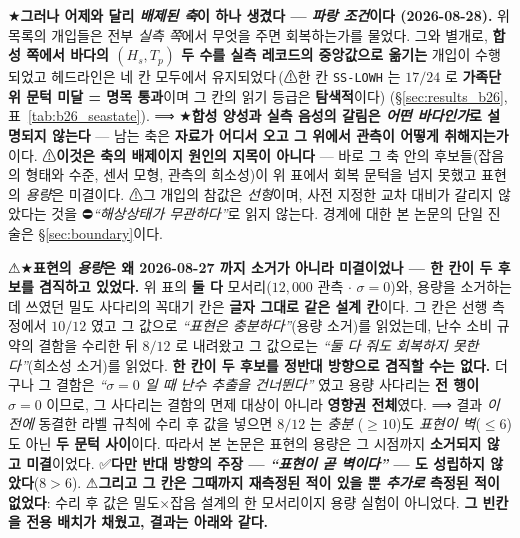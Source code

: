 \documentclass[11pt]{report}
\numberwithin{equation}{chapter}
\numberwithin{figure}{chapter}
\numberwithin{table}{chapter}
\newcommand{\SSLowhNominal}{\,(⚠한 칸 \texttt{SS-LOWH} 는 $17/24$ 로
  \textbf{가족단위 문턱 미달 = 명목 통과}이며 그 칸의 읽기 등급은 \textbf{탐색적}이다)}
\begin{document}
★\textbf{그러나 어제와 달리 \emph{배제된 축}이 하나 생겼다 --- \emph{파랑 조건}이다
(2026-08-28).} 위 목록의 개입들은 전부 \emph{실측 쪽}에서 무엇을 주면 회복하는가를
물었다. 그와 별개로, \textbf{합성 쪽에서 바다의 $(H_s, T_p)$ 두 수를 실측 레코드의
중앙값으로 옮기는} 개입이 수행되었고 헤드라인은 네 칸 모두에서 유지되었다\SSLowhNominal{}
(\S\ref{sec:results_b26}, 표~\ref{tab:b26_seastate}). ⟹ ★\textbf{합성 양성과 실측
음성의 갈림은 \emph{어떤 바다인가}로 설명되지 않는다} --- 남는 축은 \textbf{자료가
어디서 오고 그 위에서 관측이 어떻게 취해지는가}이다. ⚠\textbf{이것은 축의 배제이지
원인의 지목이 아니다} --- 바로 그 축 안의 후보들(잡음의 형태와 수준, 센서 모형, 관측의
희소성)이 위 표에서 회복 문턱을 넘지 못했고 표현의 \emph{용량}은 미결이다.
⚠그 개입의 참값은 \emph{선형}이며, 사전 지정한 교차 대비가 갈리지 않았다는 것을
⛔\emph{``해상상태가 무관하다''}로 읽지 않는다. 경계에 대한 본 논문의 단일 진술은
\S\ref{sec:boundary}이다.

⚠★\textbf{표현의 \emph{용량}은 왜 2026-08-27 까지 소거가 아니라 미결이었나 --- 한 칸이
두 후보를 겸직하고 있었다.} 위 표의 \textbf{둘 다} 모서리($12{,}000$ 관측 $\cdot$
$\sigma = 0$)와, 용량을 소거하는 데 쓰였던 밀도 사다리의 꼭대기 칸은 \textbf{글자 그대로
같은 설계 칸}이다. 그 칸은 선행 측정에서 $10/12$ 였고 그 값으로
\emph{``표현은 충분하다''}(용량 소거)를 읽었는데, 난수 소비 규약의 결함을 수리한 뒤
$8/12$ 로 내려왔고 그 값으로는 \emph{``둘 다 줘도 회복하지 못한다''}(희소성 소거)를 읽었다.
\textbf{한 칸이 두 후보를 정반대 방향으로 겸직할 수는 없다.} 더구나 그 결함은
\emph{``$\sigma = 0$ 일 때 난수 추출을 건너뛴다''} 였고 용량 사다리는 \textbf{전 행이
$\sigma = 0$} 이므로, 그 사다리는 결함의 면제 대상이 아니라 \textbf{영향권 전체}였다.
⟹ 결과 \emph{이전에} 동결한 라벨 규칙에 수리 후 값을 넣으면 $8/12$ 는 \emph{충분}
($\geq 10$)도 \emph{표현이 벽}($\leq 6$)도 아닌 \textbf{두 문턱 사이}이다. 따라서 본 논문은
표현의 용량은 그 시점까지 \textbf{소거되지 않고 미결}이었다. ✅\textbf{다만 반대 방향의 주장
--- \emph{``표현이 곧 벽이다''} --- 도 성립하지 않았다}($8 > 6$). ⚠\textbf{그리고 그 칸은
그때까지 재측정된 적이 있을 뿐 \emph{추가로} 측정된 적이 없었다}: 수리 후 값은 밀도$\times$잡음
설계의 한 모서리이지 용량 실험이 아니었다. \textbf{그 빈칸을 전용 배치가 채웠고, 결과는
아래와 같다.}
\end{document}

